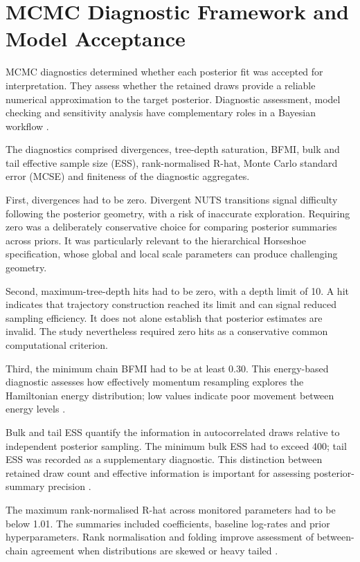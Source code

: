 \section{MCMC Diagnostic Framework and Model Acceptance}\label{mcmc-diagnostic-framework-and-model-acceptance}

MCMC diagnostics determined whether each posterior fit was accepted for interpretation. They assess whether the retained draws provide a reliable numerical approximation to the target posterior. Diagnostic assessment, model checking and sensitivity analysis have complementary roles in a Bayesian workflow \cite{ref53}.

The diagnostics comprised divergences, tree-depth saturation, BFMI, bulk and tail effective sample size (ESS), rank-normalised R-hat, Monte Carlo standard error (MCSE) and finiteness of the diagnostic aggregates.

First, divergences had to be zero. Divergent NUTS transitions signal difficulty following the posterior geometry, with a risk of inaccurate exploration. Requiring zero was a deliberately conservative choice for comparing posterior summaries across priors. It was particularly relevant to the hierarchical Horseshoe specification, whose global and local scale parameters can produce challenging geometry.

Second, maximum-tree-depth hits had to be zero, with a depth limit of 10. A hit indicates that trajectory construction reached its limit and can signal reduced sampling efficiency. It does not alone establish that posterior estimates are invalid. The study nevertheless required zero hits as a conservative common computational criterion.

Third, the minimum chain BFMI had to be at least 0.30. This energy-based diagnostic assesses how effectively momentum resampling explores the Hamiltonian energy distribution; low values indicate poor movement between energy levels \cite{betancourt2017}.

Bulk and tail ESS quantify the information in autocorrelated draws relative to independent posterior sampling. The minimum bulk ESS had to exceed 400; tail ESS was recorded as a supplementary diagnostic. This distinction between retained draw count and effective information is important for assessing posterior-summary precision \cite{ref39,ref54}.

The maximum rank-normalised R-hat across monitored parameters had to be below 1.01. The summaries included coefficients, baseline log-rates and prior hyperparameters. Rank normalisation and folding improve assessment of between-chain agreement when distributions are skewed or heavy tailed \cite{ref39}.


